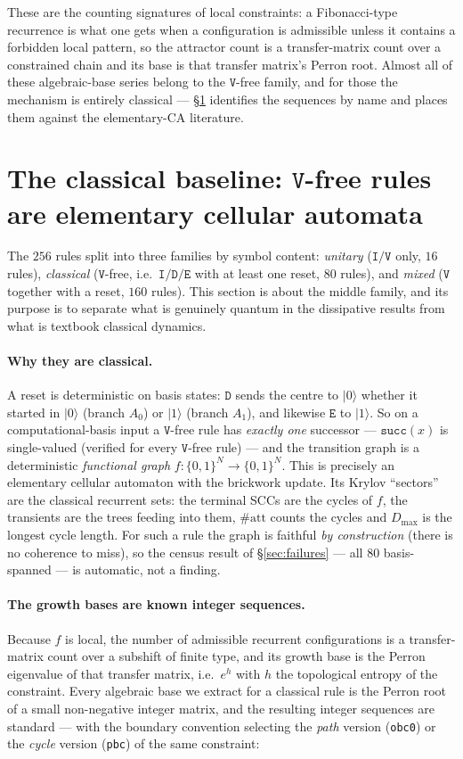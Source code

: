 \documentclass[11pt]{article}
\newcommand{\rt}[1]{\texttt{#1}}
\newcommand{\fn}[1]{\texttt{#1}}
\providecommand{\ket}[1]{|#1\rangle}
\begin{document}
These are the counting signatures of local constraints: a Fibonacci-type
recurrence is what one gets when a configuration is admissible unless it contains
a forbidden local pattern, so the attractor count is a transfer-matrix count over
a constrained chain and its base is that transfer matrix's Perron root. Almost
all of these algebraic-base series belong to the $\rt V$-free family, and for
those the mechanism is entirely classical --- \S\ref{sec:classical} identifies
the sequences by name and places them against the elementary-CA literature.

\section{The classical baseline: \texorpdfstring{$\rt V$}{V}-free rules are
elementary cellular automata}
\label{sec:classical}
The $256$ rules split into three families by symbol content:
\emph{unitary} ($\rt I/\rt V$ only, $16$ rules), \emph{classical} ($\rt V$-free,
i.e.\ $\rt I/\rt D/\rt E$ with at least one reset, $80$ rules), and \emph{mixed}
($\rt V$ together with a reset, $160$ rules). This section is about the middle
family, and its purpose is to separate what is genuinely quantum in the
dissipative results from what is textbook classical dynamics.

\paragraph{Why they are classical.} A reset is deterministic on basis states:
$\rt D$ sends the centre to $\ket0$ whether it started in $\ket0$ (branch $A_0$)
or $\ket1$ (branch $A_1$), and likewise $\rt E$ to $\ket1$. So on a
computational-basis input a $\rt V$-free rule has \emph{exactly one} successor
--- $\fn{succ}(x)$ is single-valued (verified for every $\rt V$-free rule) --- and
the transition graph is a deterministic \emph{functional graph}
$f:\{0,1\}^N\!\to\!\{0,1\}^N$. This is precisely an elementary cellular automaton
with the brickwork update. Its Krylov ``sectors'' are the classical recurrent
sets: the terminal SCCs are the cycles of $f$, the transients are the trees
feeding into them, $\#\mathrm{att}$ counts the cycles and $D_{\max}$ is the
longest cycle length. For such a rule the graph is faithful \emph{by
construction} (there is no coherence to miss), so the census result of
\S\ref{sec:failures} --- all $80$ basis-spanned --- is automatic, not a finding.

\paragraph{The growth bases are known integer sequences.} Because $f$ is local,
the number of admissible recurrent configurations is a transfer-matrix count
over a subshift of finite type, and its growth base is the Perron eigenvalue of
that transfer matrix, i.e.\ $e^{h}$ with $h$ the topological entropy of the
constraint. Every algebraic base we extract for a classical rule is the Perron
root of a small non-negative integer matrix, and the resulting integer sequences
are standard --- with the boundary convention selecting the \emph{path} version
(\rt{obc0}) or the \emph{cycle} version (\rt{pbc}) of the same constraint:
\end{document}
